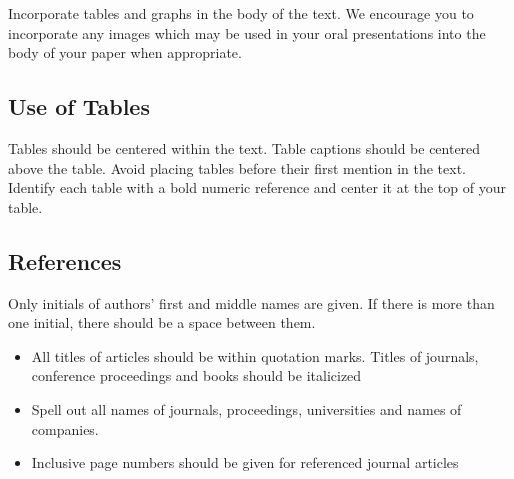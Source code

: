 \documentclass[letterpaper,times]{IONconf}
\begin{document}
Incorporate tables and graphs in the body of the text. We encourage you to incorporate any images which may be used in your oral presentations into the body of your paper when appropriate.


\subsection{Use of Tables}

Tables should be centered within the text. Table captions should be centered above the table. Avoid placing tables before their first mention in the text. Identify each table with a bold numeric reference and center it at the top of your table.


\subsection{References}

Only initials of authors' first and middle names are given. If there is more than one initial, there should be a space between them.

\begin{itemize}
    \item All titles of articles should be within quotation marks. Titles of journals, conference proceedings and books should be italicized
    \item Spell out all names of journals, proceedings, universities and names of companies.
    \item Inclusive page numbers should be given for referenced journal articles
\end{itemize}
\end{document}
